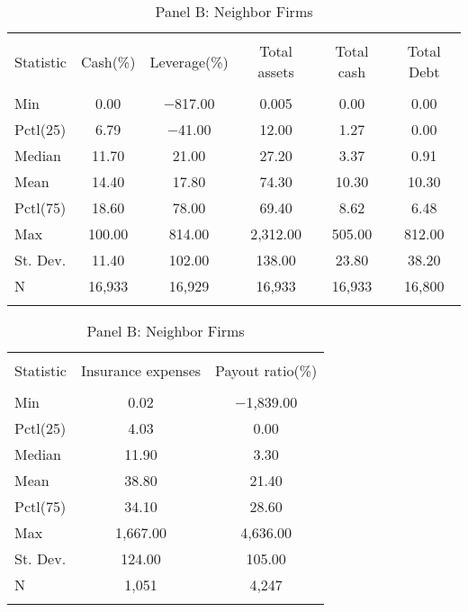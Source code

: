 \begin{table}[!htbp] \centering 
  \caption{Panel B: Neighbor Firms} 
  \label{} 
\begin{tabular}{@{\extracolsep{5pt}}lccccc} 
\\[-1.8ex]\hline 
\hline \\[-1.8ex] 
Statistic & Cash(\%) & Leverage(\%) & Total assets & Total cash & Total Debt \\ 
\hline \\[-1.8ex] 
Min & 0.00 & $-$817.00 & 0.005 & 0.00 & 0.00 \\ 
Pctl(25) & 6.79 & $-$41.00 & 12.00 & 1.27 & 0.00 \\ 
Median & 11.70 & 21.00 & 27.20 & 3.37 & 0.91 \\ 
Mean & 14.40 & 17.80 & 74.30 & 10.30 & 10.30 \\ 
Pctl(75) & 18.60 & 78.00 & 69.40 & 8.62 & 6.48 \\ 
Max & 100.00 & 814.00 & 2,312.00 & 505.00 & 812.00 \\ 
St. Dev. & 11.40 & 102.00 & 138.00 & 23.80 & 38.20 \\ 
N & 16,933 & 16,929 & 16,933 & 16,933 & 16,800 \\ 
\hline \\[-1.8ex] 
\end{tabular} 
\end{table} 

\begin{table}[!htbp] \centering 
  \caption{Panel B: Neighbor Firms} 
  \label{} 
\begin{tabular}{@{\extracolsep{5pt}}lcc} 
\\[-1.8ex]\hline 
\hline \\[-1.8ex] 
Statistic & Insurance expenses & Payout ratio(\%) \\ 
\hline \\[-1.8ex] 
Min & 0.02 & $-$1,839.00 \\ 
Pctl(25) & 4.03 & 0.00 \\ 
Median & 11.90 & 3.30 \\ 
Mean & 38.80 & 21.40 \\ 
Pctl(75) & 34.10 & 28.60 \\ 
Max & 1,667.00 & 4,636.00 \\ 
St. Dev. & 124.00 & 105.00 \\ 
N & 1,051 & 4,247 \\ 
\hline \\[-1.8ex] 
\end{tabular} 
\end{table} 


